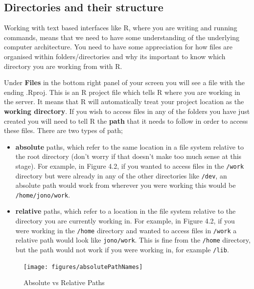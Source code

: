 \documentclass[
]{book}
\providecommand{\tightlist}{%
  \setlength{\itemsep}{0pt}\setlength{\parskip}{0pt}}
\begin{document}
\hypertarget{directories-and-their-structure}{%
\subsection{Directories and their structure}\label{directories-and-their-structure}}

Working with text based interfaces like R, where you are writing and running commands, means that we need to have some understanding of the underlying computer architecture. You need to have some appreciation for how files are organised within folders/directories and why its important to know which directory you are working from with R.

Under \textbf{Files} in the bottom right panel of your screen you will see a file with the ending .Rproj. This is an R project file which tells R where you are working in the server. It means that R will automatically treat your project location as the \textbf{working directory}. If you wish to access files in any of the folders you have just created you will need to tell R the \textbf{path} that it needs to follow in order to access these files. There are two types of path;

\begin{itemize}
\tightlist
\item
  \textbf{absolute} paths, which refer to the same location in a file system relative to the root directory (don't worry if that doesn't make too much sense at this stage). For example, in Figure 4.2, if you wanted to access files in the \texttt{/work} directory but were already in any of the other directories like \texttt{/dev}, an absolute path would work from wherever you were working this would be \texttt{/home/jono/work}.
\item
  \textbf{relative} paths, which refer to a location in the file system relative to the directory you are currently working in. For example, in Figure 4.2, if you were working in the \texttt{/home} directory and wanted to access files in \texttt{/work} a relative path would look like \texttt{jono/work}. This is fine from the \texttt{/home} directory, but the path would not work if you were working in, for example \texttt{/lib}.
\end{itemize}

\begin{figure}
\texttt{[image: figures/absolutePathNames]} \caption{Absolute vs Relative Paths}\label{fig:unnamed-chunk-24}
\end{figure}
\end{document}
